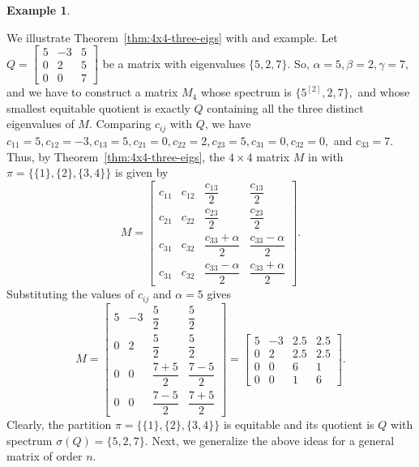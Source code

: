 \documentclass[12pt,twoside]{article}
\newtheorem{example}[theorem]{Example}
\begin{document}
\begin{example}\label{ex:4x4-nontrivial}\end{example}
	We illustrate Theorem~\ref{thm:4x4-three-eigs} with and example.
	Let $Q=
	\begin{bmatrix}
		5 & -3 & 5\\
		0 &  2 & 5\\
		0 &  0 & 7
	\end{bmatrix}$ be a matrix with eigenvalues $\{5,2,7\}.$
	 So, $\alpha = 5, \beta=2,\gamma=7,$	and we have to construct a matrix $M_{4}$ whose spectrum is
$\{5^{[2]},2,7\},$	and whose smallest equitable quotient is exactly $Q$ containing all the three distinct eigenvalues of $M.$  Comparing  $c_{ij}$  with $Q$, we have $
	c_{11}=5,c_{12}=-3, c_{13}=5,
	c_{21}=0, c_{22}=2, c_{23}=5,
	c_{31}=0, c_{32}=0, $ and $ c_{33}=7.$ Thus, by Theorem~\ref{thm:4x4-three-eigs}, the $4\times 4$ matrix $M$ in with  $\pi=\bigl\{\{1\},\{2\},\{3,4\}\bigr\}$ is given by
	$$
	M=
	\begin{bmatrix}
		c_{11} & c_{12} & \dfrac{c_{13}}{2} & \dfrac{c_{13}}{2}\\
		c_{21} & c_{22} & \dfrac{c_{23}}{2} & \dfrac{c_{23}}{2}\\
		c_{31} & c_{32} & \dfrac{c_{33}+\alpha}{2} & \dfrac{c_{33}-\alpha}{2}\\
		c_{31} & c_{32} & \dfrac{c_{33}-\alpha}{2} & \dfrac{c_{33}+\alpha}{2}
	\end{bmatrix}.
	$$
	Substituting the values of $c_{ij}$ and $\alpha=5$ gives
	$$
	M=
	\begin{bmatrix}
		5 & -3 & \dfrac{5}{2} & \dfrac{5}{2}\\
		0 &  2 & \dfrac{5}{2} & \dfrac{5}{2}\\
		0 &  0 & \dfrac{7+5}{2} & \dfrac{7-5}{2}\\
		0 &  0 & \dfrac{7-5}{2} & \dfrac{7+5}{2}
	\end{bmatrix}
	=
	\begin{bmatrix}
		5 & -3 & 2.5 & 2.5\\
		0 &  2 & 2.5 & 2.5\\
		0 &  0 & 6   & 1  \\
		0 &  0 & 1   & 6
	\end{bmatrix}.
	$$
	Clearly, the partition $\pi=\bigl\{\{1\},\{2\},\{3,4\}\bigr\}$ is equitable and its quotient is $Q$ with spectrum $\sigma(Q)=\{5,2,7\}$.
Next, we generalize the above ideas for a general matrix of order $n$.
\end{document}
